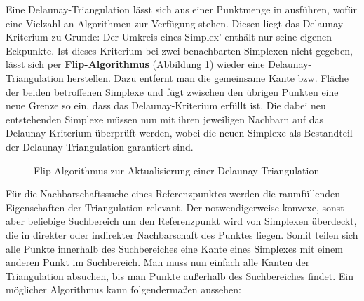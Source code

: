 Eine Delaunay-Triangulation lässt sich aus einer Punktmenge in  ausführen, wofür eine Vielzahl an Algorithmen zur Verfügung stehen. 
Diesen liegt das Delaunay-Kriterium zu Grunde:
Der Umkreis eines Simplex' enthält nur seine eigenen Eckpunkte.
Ist dieses Kriterium bei zwei benachbarten Simplexen nicht gegeben, lässt sich per \textbf{Flip-Algorithmus} (Abbildung \ref{fig:delaunay-flip}) wieder eine Delaunay-Triangulation herstellen.
Dazu entfernt man die gemeinsame Kante bzw. Fläche der beiden betroffenen Simplexe und fügt zwischen den übrigen Punkten eine neue Grenze so ein, dass das Delaunay-Kriterium erfüllt ist.
Die dabei neu entstehenden Simplexe müssen nun mit ihren jeweiligen Nachbarn auf das Delaunay-Kriterium überprüft werden, wobei die neuen Simplexe als Bestandteil der Delaunay-Triangulation garantiert sind.

\begin{figure}[bhpt]
  \caption{Flip Algorithmus zur Aktualisierung einer Delaunay-Triangulation}
  \label{fig:delaunay-flip}
\end{figure}


Für die Nachbarschaftssuche eines Referenzpunktes werden die raumfüllenden Eigenschaften der Triangulation relevant.
Der notwendigerweise konvexe, sonst aber beliebige Suchbereich um den Referenzpunkt wird von Simplexen überdeckt, die in direkter oder indirekter Nachbarschaft des Punktes liegen.
Somit teilen sich alle Punkte innerhalb des Suchbereiches eine Kante eines Simplexes mit einem anderen Punkt im Suchbereich.
Man muss nun einfach alle Kanten der Triangulation absuchen, bis man Punkte außerhalb des Suchbereiches findet.
Ein möglicher Algorithmus kann folgendermaßen aussehen:

